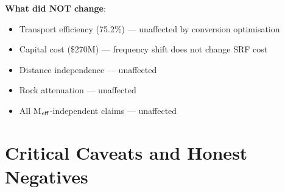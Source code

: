 \documentclass[11pt]{article}
\begin{document}
\begin{tcolorbox}[colback=green!5!white, colframe=green!60!black,
  title=\textbf{P4 Underground WPT: W4i10 Consolidated Status}]
\textbf{What did NOT change}:
\begin{itemize}[nosep]
\item Transport efficiency (75.2\%) --- unaffected by conversion optimisation
\item Capital cost (\$270M) --- frequency shift does not change SRF cost
\item Distance independence --- unaffected
\item Rock attenuation --- unaffected
\item All M$_{\rm eff}$-independent claims --- unaffected
\end{itemize}
\end{tcolorbox}

\section{Critical Caveats and Honest Negatives}
\label{sec:caveats}
\end{document}
